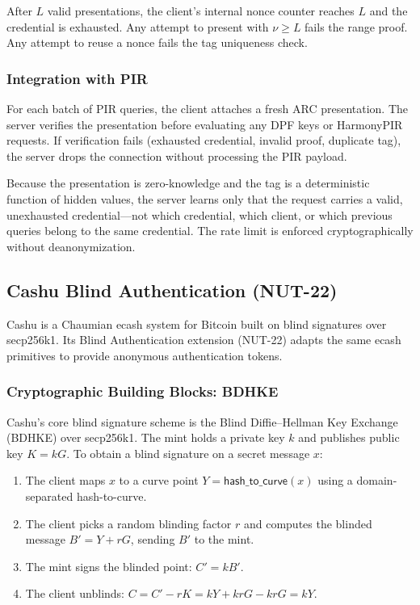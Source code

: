 After $L$ valid presentations, the client's internal nonce counter reaches $L$ and the credential is exhausted. Any attempt to present with $\nu \geq L$ fails the range proof. Any attempt to reuse a nonce fails the tag uniqueness check.

\subsubsection{Integration with PIR}

For each batch of PIR queries, the client attaches a fresh ARC presentation. The server verifies the presentation before evaluating any DPF keys or HarmonyPIR requests. If verification fails (exhausted credential, invalid proof, duplicate tag), the server drops the connection without processing the PIR payload.

Because the presentation is zero-knowledge and the tag is a deterministic function of hidden values, the server learns only that the request carries a valid, unexhausted credential---not which credential, which client, or which previous queries belong to the same credential. The rate limit is enforced cryptographically without deanonymization.

\subsection{Cashu Blind Authentication (NUT-22)}

Cashu \cite{cashu} is a Chaumian ecash system for Bitcoin built on blind signatures over secp256k1. Its Blind Authentication extension (NUT-22) adapts the same ecash primitives to provide anonymous authentication tokens.

\subsubsection{Cryptographic Building Blocks: BDHKE}

Cashu's core blind signature scheme is the Blind Diffie--Hellman Key Exchange (BDHKE) over secp256k1. The mint holds a private key $k$ and publishes public key $K = kG$. To obtain a blind signature on a secret message $x$:

\begin{enumerate}[nolistsep,leftmargin=*]
    \item The client maps $x$ to a curve point $Y = \mathsf{hash\_to\_curve}(x)$ using a domain-separated hash-to-curve.
    \item The client picks a random blinding factor $r$ and computes the blinded message $B' = Y + rG$, sending $B'$ to the mint.
    \item The mint signs the blinded point: $C' = k B'$.
    \item The client unblinds: $C = C' - rK = kY + krG - krG = kY$.
\end{enumerate}

